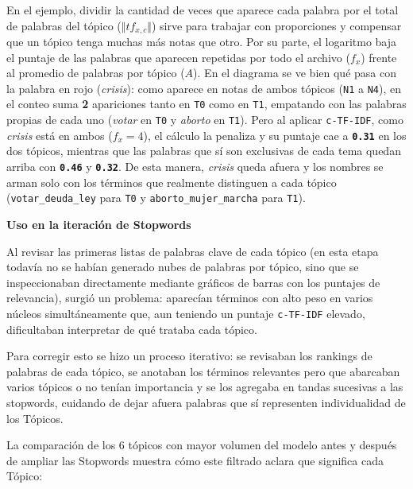 \documentclass[
]{article}
\begin{document}
En el ejemplo, dividir la cantidad de veces que aparece cada palabra por
el total de palabras del tópico (\(\Vert{}tf_{x,c}\Vert{}\)) sirve para
trabajar con proporciones y compensar que un tópico tenga muchas más
notas que otro. Por su parte, el logaritmo baja el puntaje de las
palabras que aparecen repetidas por todo el archivo (\(f_x\)) frente al
promedio de palabras por tópico (\(A\)). En el diagrama se ve bien qué
pasa con la palabra en rojo (\emph{crisis}): como aparece en notas de
ambos tópicos (\texttt{N1} a \texttt{N4}), en el conteo suma \textbf{2}
apariciones tanto en \texttt{T0} como en \texttt{T1}, empatando con las
palabras propias de cada uno (\emph{votar} en \texttt{T0} y
\emph{aborto} en \texttt{T1}). Pero al aplicar \texttt{c-TF-IDF}, como
\emph{crisis} está en ambos (\(f_x = 4\)), el cálculo la penaliza y su
puntaje cae a \textbf{\texttt{0.31}} en los dos tópicos, mientras que
las palabras que sí son exclusivas de cada tema quedan arriba con
\textbf{\texttt{0.46}} y \textbf{\texttt{0.32}}. De esta manera,
\emph{crisis} queda afuera y los nombres se arman solo con los términos
que realmente distinguen a cada tópico (\texttt{votar\_deuda\_ley} para
\texttt{T0} y \texttt{aborto\_mujer\_marcha} para \texttt{T1}).

\textbf{Uso en la iteración de Stopwords}

Al revisar las primeras listas de palabras clave de cada tópico (en esta
etapa todavía no se habían generado nubes de palabras por tópico, sino
que se inspeccionaban directamente mediante gráficos de barras con los
puntajes de relevancia), surgió un problema: aparecían términos con alto
peso en varios núcleos simultáneamente que, aun teniendo un puntaje
\texttt{c-TF-IDF} elevado, dificultaban interpretar de qué trataba cada
tópico.

Para corregir esto se hizo un proceso iterativo: se revisaban los
rankings de palabras de cada tópico, se anotaban los términos relevantes
pero que abarcaban varios tópicos o no tenían importancia y se los
agregaba en tandas sucesivas a las stopwords, cuidando de dejar afuera
palabras que sí representen individualidad de los Tópicos.

La comparación de los 6 tópicos con mayor volumen del modelo antes y
después de ampliar las Stopwords muestra cómo este filtrado aclara que
significa cada Tópico:
\end{document}
